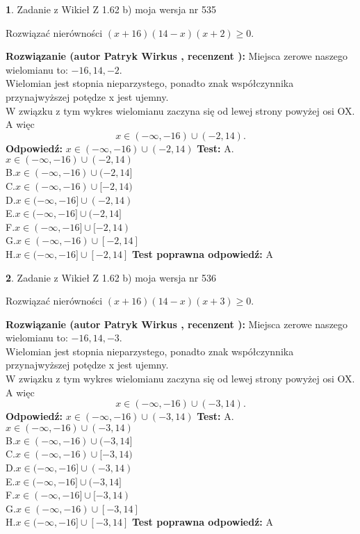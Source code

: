 \documentclass[12pt, a4paper]{article}
\theoremstyle{definition} %
\newtheorem{zad}{}
\newcommand{\zadStart}[1]{\begin{zad}#1\newline}
\newcommand{\zadStop}{\end{zad}}
\newcommand{\rozwStart}[2]{\noindent \textbf{Rozwiązanie (autor #1 , recenzent #2): }\newline}
\newcommand{\rozwStop}{\newline}
\newcommand{\odpStart}{\noindent \textbf{Odpowiedź:}\newline}
\newcommand{\odpStop}{\newline}
\newcommand{\testStart}{\noindent \textbf{Test:}\newline}
\newcommand{\testStop}{\newline}
\newcommand{\kluczStart}{\noindent \textbf{Test poprawna odpowiedź:}\newline}
\newcommand{\kluczStop}{\newline}
\begin{document}
\zadStart{Zadanie z Wikieł Z 1.62 b) moja wersja nr 535}

Rozwiązać nierówności $(x+16)(14-x)(x+2)\ge0$.
\zadStop
\rozwStart{Patryk Wirkus}{}
Miejsca zerowe naszego wielomianu to: $-16, 14, -2$.\\
Wielomian jest stopnia nieparzystego, ponadto znak współczynnika przy\linebreak najwyższej potędze x jest ujemny.\\ W związku z tym wykres wielomianu zaczyna się od lewej strony powyżej osi OX. A więc $$x \in (-\infty,-16) \cup (-2,14).$$
\rozwStop
\odpStart
$x \in (-\infty,-16) \cup (-2,14)$
\odpStop
\testStart
A.$x \in (-\infty,-16) \cup (-2,14)$\\
B.$x \in (-\infty,-16) \cup (-2,14]$\\
C.$x \in (-\infty,-16) \cup [-2,14)$\\
D.$x \in (-\infty,-16] \cup (-2,14)$\\
E.$x \in (-\infty,-16] \cup (-2,14]$\\
F.$x \in (-\infty,-16] \cup [-2,14)$\\
G.$x \in (-\infty,-16) \cup [-2,14]$\\
H.$x \in (-\infty,-16] \cup [-2,14]$
\testStop
\kluczStart
A
\kluczStop



\zadStart{Zadanie z Wikieł Z 1.62 b) moja wersja nr 536}

Rozwiązać nierówności $(x+16)(14-x)(x+3)\ge0$.
\zadStop
\rozwStart{Patryk Wirkus}{}
Miejsca zerowe naszego wielomianu to: $-16, 14, -3$.\\
Wielomian jest stopnia nieparzystego, ponadto znak współczynnika przy\linebreak najwyższej potędze x jest ujemny.\\ W związku z tym wykres wielomianu zaczyna się od lewej strony powyżej osi OX. A więc $$x \in (-\infty,-16) \cup (-3,14).$$
\rozwStop
\odpStart
$x \in (-\infty,-16) \cup (-3,14)$
\odpStop
\testStart
A.$x \in (-\infty,-16) \cup (-3,14)$\\
B.$x \in (-\infty,-16) \cup (-3,14]$\\
C.$x \in (-\infty,-16) \cup [-3,14)$\\
D.$x \in (-\infty,-16] \cup (-3,14)$\\
E.$x \in (-\infty,-16] \cup (-3,14]$\\
F.$x \in (-\infty,-16] \cup [-3,14)$\\
G.$x \in (-\infty,-16) \cup [-3,14]$\\
H.$x \in (-\infty,-16] \cup [-3,14]$
\testStop
\kluczStart
A
\kluczStop
\end{document}
